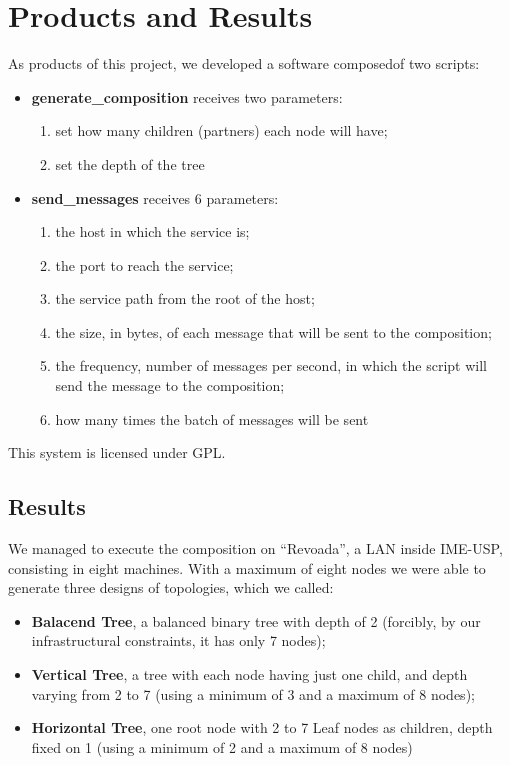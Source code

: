 \section{Products and Results}

As products of this project, we developed a software composedof two scripts:
\begin{itemize}
	\item \textbf{generate\_composition} receives two parameters:
	\begin{enumerate}
		\item set how many children (partners) each node will have;
		\item set the depth of the tree
	\end{enumerate}
	\item \textbf{send\_messages} receives 6 parameters:
	\begin{enumerate}
		\item the host in which the service is;
		\item the port to reach the service;
		\item the service path from the root of the host;
		\item the size, in bytes, of each message that will be sent to the composition;
		\item the frequency, number of messages per second, in which the script will send the message to the composition;
		\item how many times the batch of messages will be sent
	\end{enumerate}
\end{itemize}

This system is licensed under GPL.

\subsection{Results}
We managed to execute the composition on ``Revoada'', a LAN inside IME-USP, consisting in eight machines. With a maximum of eight nodes we were able to generate three designs of topologies, which we called:

\begin{itemize}
	\item \textbf{Balacend Tree}, a balanced binary tree with depth of 2 (forcibly, by our infrastructural constraints, it has only 7 nodes);
	\item \textbf{Vertical Tree}, a tree with each node having just one child, and depth varying from 2 to 7 (using a minimum of 3 and a maximum of 8 nodes);
	\item \textbf{Horizontal Tree}, one root node with 2 to 7 Leaf nodes as children, depth fixed on 1 (using a minimum of 2 and a maximum of 8 nodes)
\end{itemize}

